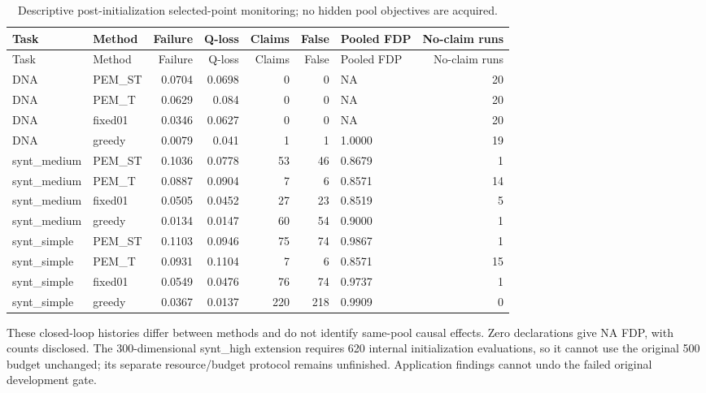 \documentclass[11pt,a4paper]{article}
\begin{document}
\par\noindent\begin{minipage}{\linewidth}

\begin{longtable}[]{@{}llrrrrlr@{}}
\caption{Descriptive post-initialization selected-point monitoring; no
hidden pool objectives are acquired.}\tabularnewline
\toprule
Task & Method & Failure & Q-loss & Claims & False & Pooled FDP &
No-claim runs \\
\midrule
\endfirsthead
\toprule
Task & Method & Failure & Q-loss & Claims & False & Pooled FDP &
No-claim runs \\
\midrule
\endhead
DNA & PEM\_ST & 0.0704 & 0.0698 & 0 & 0 & NA & 20 \\
DNA & PEM\_T & 0.0629 & 0.084 & 0 & 0 & NA & 20 \\
DNA & fixed01 & 0.0346 & 0.0627 & 0 & 0 & NA & 20 \\
DNA & greedy & 0.0079 & 0.041 & 1 & 1 & 1.0000 & 19 \\
synt\_medium & PEM\_ST & 0.1036 & 0.0778 & 53 & 46 & 0.8679 & 1 \\
synt\_medium & PEM\_T & 0.0887 & 0.0904 & 7 & 6 & 0.8571 & 14 \\
synt\_medium & fixed01 & 0.0505 & 0.0452 & 27 & 23 & 0.8519 & 5 \\
synt\_medium & greedy & 0.0134 & 0.0147 & 60 & 54 & 0.9000 & 1 \\
synt\_simple & PEM\_ST & 0.1103 & 0.0946 & 75 & 74 & 0.9867 & 1 \\
synt\_simple & PEM\_T & 0.0931 & 0.1104 & 7 & 6 & 0.8571 & 15 \\
synt\_simple & fixed01 & 0.0549 & 0.0476 & 76 & 74 & 0.9737 & 1 \\
synt\_simple & greedy & 0.0367 & 0.0137 & 220 & 218 & 0.9909 & 0 \\
\bottomrule
\end{longtable}

\end{minipage}\par

These closed-loop histories differ between methods and do not identify
same-pool causal effects. Zero declarations give NA FDP, with counts
disclosed. The 300-dimensional synt\_high extension requires 620
internal initialization evaluations, so it cannot use the original 500
budget unchanged; its separate resource/budget protocol remains
unfinished. Application findings cannot undo the failed original
development gate.
\end{document}
